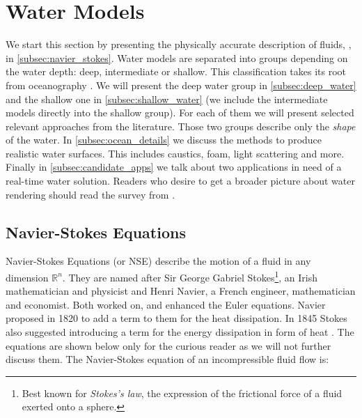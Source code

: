 \section{Water Models}\label{sec:water_models}



We start this section by presenting the physically accurate description of
fluids, , in \autoref{subsec:navier_stokes}. Water
models are separated into groups depending on the water depth: deep,
intermediate or shallow. This classification takes its root from oceanography
\autocite{darles2011survey}. We will present the deep water group in
\autoref{subsec:deep_water} and the shallow one in
\autoref{subsec:shallow_water} (we include the intermediate models directly into
the shallow group). For each of them we will present selected relevant
approaches from the literature. Those two groups describe only the
\textit{shape} of the water. In \autoref{subsec:ocean_details} we discuss the
methods to produce realistic water surfaces. This includes caustics, foam, light
scattering and more. Finally in \autoref{subsec:candidate_apps} we talk about
two applications in need of a real-time water solution. Readers who desire to
get a broader picture about water rendering should read the survey from
\citeauthor{darles2011survey} \autocite{darles2011survey}.


\subsection{Navier-Stokes Equations}\label{subsec:navier_stokes}


Navier-Stokes Equations (or NSE) describe the motion of a fluid in any dimension
$\mathbb{R}^n$. They are named after Sir George Gabriel Stokes\footnote{Best
known for \textit{Stokes's law}, the expression of the frictional force of a
fluid exerted onto a sphere.}, an Irish mathematician and physicist and Henri
Navier, a French engineer, mathematician and economist. Both worked on, and
enhanced the Euler equations. Navier proposed in 1820 to add a term to them for
the heat dissipation. In 1845 Stokes also suggested introducing a term for the
energy dissipation in form of heat \autocite{gallagher2010autour}. The equations
are shown below only for the curious reader as we will not further discuss them.
The Navier-Stokes equation of an incompressible fluid flow is:

